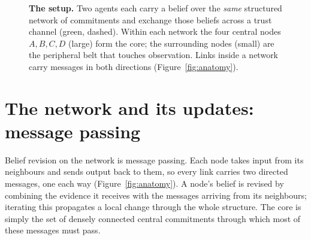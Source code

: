 \documentclass[11pt,a4paper]{article}
\def\corelist{A/0/0, B/2.4/0, C/0/-2.4, D/2.4/-2.4}
\def\periphlist{%
  pA1/-2.1/1.0/a_1, pA2/-0.4/1.9/a_2, pA3/-2.3/-0.6/a_3,
  pB1/2.8/1.9/, pB2/4.5/1.0/, pB3/4.7/-0.5/,
  pC1/-2.3/-1.8/, pC2/-2.1/-3.4/, pC3/-0.4/-4.3/,
  pD1/2.8/-4.3/, pD2/4.5/-3.4/, pD3/4.7/-1.9/}
\def\coreedges{A/B, A/C, B/D, C/D, A/D}
\def\periphedges{A/pA1, A/pA2, A/pA3, B/pB1, B/pB2, B/pB3,
                 C/pC1, C/pC2, C/pC3, D/pD1, D/pD2, D/pD3}
\def\crossedges{pA1/pA2, pA2/pB1, pB3/pD3, pD1/pC3, pA3/pC1}
\newcommand{\mininet}[2]{%
  \begin{scope}[shift={#2},scale=0.40,transform shape]
    \foreach \n/\x/\y in \corelist
      {\node[bnode,old,minimum size=8mm,line width=0.9pt] (#1\n) at (\x,\y) {$\n$};}
    \foreach \n/\x/\y/\lab in \periphlist
      {\node[bnode,old,minimum size=5.5mm] (#1\n) at (\x,\y) {};}
    \begin{scope}[on background layer]
      \foreach \a/\b in \coreedges  {\draw[minilink] (#1\a)--(#1\b);}
      \foreach \a/\b in \periphedges{\draw[minilink] (#1\a)--(#1\b);}
      \foreach \a/\b in \crossedges {\draw[minilink] (#1\a)--(#1\b);}
    \end{scope}
  \end{scope}}
\begin{document}
\begin{figure}[t]
\centering
{}
\caption{\textbf{The setup.} Two agents each carry a belief over the
\emph{same} structured network of commitments and exchange those beliefs across
a trust channel (green, dashed). Within each network the four central nodes
$A,B,C,D$ (large) form the core; the surrounding nodes (small) are the
peripheral belt that touches observation. Links inside a network carry messages
in both directions (Figure~\ref{fig:anatomy}).}
\label{fig:setup}
\end{figure}

\section{The network and its updates: message passing}

Belief revision on the network is message passing. Each node takes input from
its neighbours and sends output back to them, so every link carries two
directed messages, one each way (Figure~\ref{fig:anatomy}). A node's belief is
revised by combining the evidence it receives with the messages arriving from
its neighbours; iterating this propagates a local change through the whole
structure. The core is simply the set of densely connected central commitments
through which most of these messages must pass.
\end{document}

